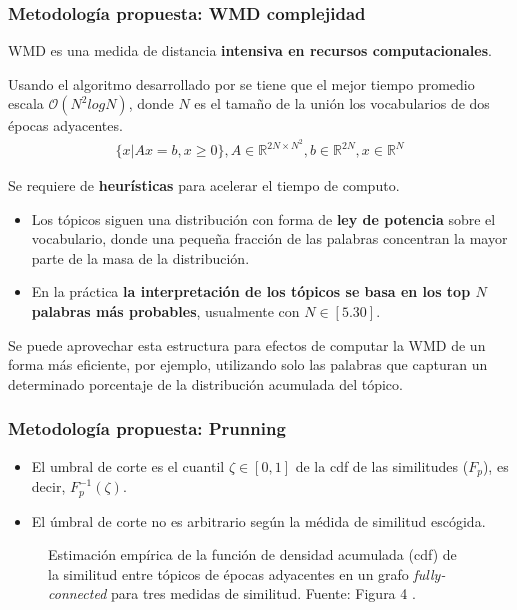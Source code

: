 \documentclass[
	spanish, %
	aspectratio=43, %
	hyperref={pdfencoding=auto,psdextra},
	xcolor={dvipsnames,table,usenames},
]{beamer}
\begin{document}
\begin{frame}[t]
\frametitle{Metodología propuesta: WMD complejidad}

WMD es una medida de distancia \textbf{intensiva en recursos computacionales}.\newline\newline

Usando el algoritmo desarrollado por \cite{pele2009fast} se tiene que el mejor tiempo promedio escala $\mathcal{O}(N^{2}log N)$, donde $N$ es el tamaño de la unión los vocabularios de dos épocas adyacentes.
  \begin{align*}
\{x| Ax=b, x\geq 0\}, A\in \mathbb{R}^{2N\times N^{2}}, b\in \mathbb{R}^{2N}, x\in \mathbb{R}^{N}
  \end{align*}

Se requiere de \textbf{heurísticas} para acelerar el tiempo de computo.
\begin{itemize}
  \item Los tópicos siguen una distribución con forma de \textbf{ley de potencia} sobre el vocabulario, donde una pequeña fracción de las palabras concentran la mayor parte de la masa de la distribución. 
  \item En la práctica \textbf{la interpretación de los tópicos se basa en los top $N$ palabras más probables}, usualmente con $N \in [5.30]$.
\end{itemize}

Se puede aprovechar esta estructura para efectos de computar la WMD de un forma más eficiente, por ejemplo, utilizando solo las palabras que capturan un determinado porcentaje de la distribución acumulada del tópico.
\end{frame}


\begin{frame}[t]
\frametitle{Metodología propuesta: Prunning}

\begin{itemize}
  \item El umbral de corte es el cuantil $\zeta \in [0,1]$ de la cdf de las similitudes ($F_{p}$), es decir, $F_{p}^{-1}(\zeta)$.
  \item El úmbral de corte no es arbitrario según la médida de similitud escógida.
\end{itemize}

\vspace*{-0.3in}
\begin{figure}
  \caption{Estimación empírica de la función de densidad acumulada (cdf) de la similitud entre tópicos de épocas adyacentes en un grafo \textit{fully-connected} para tres medidas de similitud. Fuente: Figura 4 \cite{beykikhoshk2018discovering}.}
  \label{img:cdf_sim}
\end{figure}
\end{frame}
\end{document}
